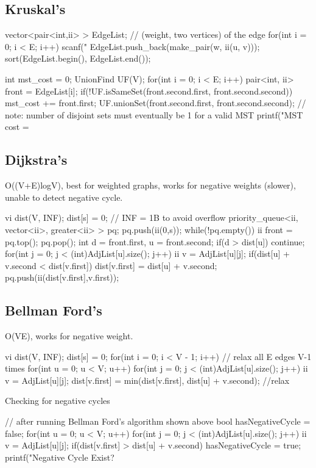 \documentclass{article}
\begin{document}
\subsection{Kruskal's}
\begin{mylisting}{}
vector<pair<int,ii> > EdgeList;	// (weight, two vertices) of the edge
for(int i = 0; i < E; i++){
	scanf("%
	EdgeList.push_back(make_pair(w, ii(u, v)));
}
sort(EdgeList.begin(), EdgeList.end());

int mst_cost = 0;
UnionFind UF(V);
for(int i = 0; i < E; i++){
	pair<int, ii> front = EdgeList[i];
	if(!UF.isSameSet(front.second.first, front.second.second)){
		mst_cost += front.first;
		UF.unionSet(front.second.first, front.second.second);
	}
} // note: number of disjoint sets must eventually be 1 for a valid MST
printf("MST cost = %
\end{mylisting}

\subsection{Dijkstra's}
O((V+E)logV), best for weighted graphs, works for negative weights (slower), unable to detect negative cycle.
\begin{mylisting}{}
vi dist(V, INF); dist[s] = 0;		// INF = 1B to avoid overflow
priority_queue<ii, vector<ii>, greater<ii> > pq; pq.push(ii(0,s));
while(!pq.empty()){
	ii front = pq.top(); pq.pop();	
	int d = front.first, u = front.second;
	if(d > dist[u]) continue;		
	for(int j = 0; j < (int)AdjList[u].size(); j++){
		ii v = AdjList[u][j];	
		if(dist[u] + v.second < dist[v.first]){
			dist[v.first] = dist[u] + v.second;	
			pq.push(ii(dist[v.first],v.first));
		}
	}
}
\end{mylisting}

\subsection{Bellman Ford's}
O(VE), works for negative weight.
\begin{mylisting}{}
vi dist(V, INF); dist[s] = 0;
for(int i = 0; i < V - 1; i++){		// relax all E edges V-1 times
	for(int u = 0; u < V; u++){
		for(int j = 0; j < (int)AdjList[u].size(); j++){
			ii v = AdjList[u][j];
			dist[v.first] = min(dist[v.first], dist[u] + v.second);	
		} //relax
	}
}
\end{mylisting}
\pagebreak
Checking for negative cycles
\begin{mylisting}{}
// after running Bellman Ford's algorithm shown above
bool hasNegativeCycle = false;
for(int u = 0; u < V; u++){
	for(int j = 0; j < (int)AdjList[u].size(); j++){
		ii v = AdjList[u][j];
		if(dist[v.first] > dist[u] + v.second)
			hasNegativeCycle = true;	
	}
}
printf("Negative Cycle Exist? %
\end{mylisting}
\end{document}
